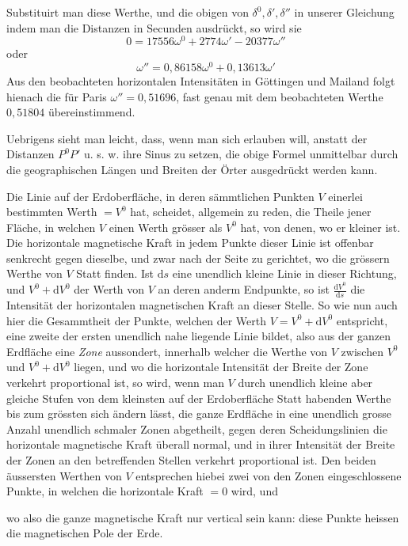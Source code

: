 \par\clearpage
{}
\noindent Substituirt man diese Werthe, und die obigen von $\delta^0,\delta',\delta''$ in unserer Gleichung indem man die Distanzen in Secunden ausdrückt, so wird sie
\[
0=17556\omega^0+2774\omega'-20377\omega''
\]
oder
\[
\omega''=0{,}86158\omega^0+0{,}13613\omega'
\]
Aus den beobachteten horizontalen Intensitäten in Göttingen und Mailand folgt hienach die für Paris $\omega''=0{,}51696$, fast genau mit dem beobachteten Werthe $0{,}51804$ übereinstimmend.

Uebrigens sieht man leicht, dass, wenn man sich erlauben will, anstatt der Distanzen $P^0P'$ u. s. w. ihre Sinus zu setzen, die obige Formel unmittelbar durch die geographischen Längen und Breiten der Örter ausgedrückt werden kann.

Die Linie auf der Erdoberfläche, in deren sämmtlichen Punkten $V$ einerlei bestimmten Werth $=V^0$ hat, scheidet, allgemein zu reden, die Theile jener Fläche, in welchen $V$ einen Werth grösser als $V^0$ hat, von denen, wo er kleiner ist. Die horizontale magnetische Kraft in jedem Punkte dieser Linie ist offenbar senkrecht gegen dieselbe, und zwar nach der Seite zu gerichtet, wo die grössern Werthe von $V$ Statt finden. Ist $\mathrm{d}s$ eine unendlich kleine Linie in dieser Richtung, und $V^0+\mathrm{d}V^0$ der Werth von $V$ an deren anderm Endpunkte, so ist $\frac{\mathrm{d}V^0}{\mathrm{d}s}$ die Intensität der horizontalen magnetischen Kraft an dieser Stelle. So wie nun auch hier die Gesammtheit der Punkte, welchen der Werth $V=V^0+\mathrm{d}V^0$ entspricht, eine zweite der ersten unendlich nahe liegende Linie bildet, also aus der ganzen Erdfläche eine \textit{Zone} aussondert, innerhalb welcher die Werthe von $V$ zwischen $V^0$ und $V^0+\mathrm{d}V^0$ liegen, und wo die horizontale Intensität der Breite der Zone verkehrt proportional ist, so wird, wenn man $V$ durch unendlich kleine aber gleiche Stufen von dem kleinsten auf der Erdoberfläche Statt habenden Werthe bis zum grössten sich ändern lässt, die ganze Erdfläche in eine unendlich grosse Anzahl unendlich schmaler Zonen abgetheilt, gegen deren Scheidungslinien die horizontale magnetische Kraft überall normal, und in ihrer Intensität der Breite der Zonen an den betreffenden Stellen verkehrt proportional ist. Den beiden äussersten Werthen von $V$ entsprechen hiebei zwei von den Zonen eingeschlossene Punkte, in welchen die horizontale Kraft $=0$ wird, und
\par\clearpage
{}
\noindent wo also die ganze magnetische Kraft nur vertical sein kann: diese Punkte heissen die magnetischen Pole der Erde.

